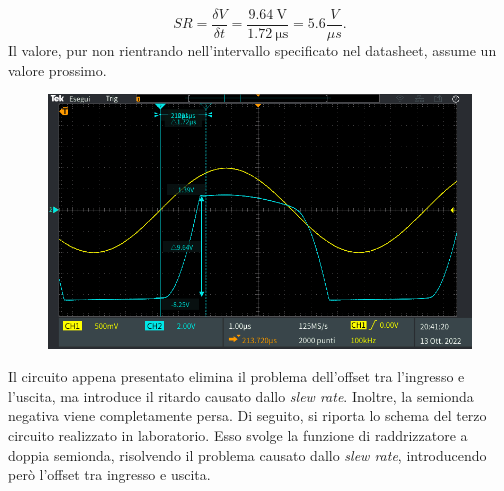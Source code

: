 \begin{equation}
	SR=\frac{\delta V}{\delta t}=\frac{\SI{9.64}{\volt}}{\SI{1.72}{\micro\second}}=5. 6\frac{V}{\mu s}.
\end{equation}
Il valore, pur non rientrando nell'intervallo specificato nel datasheet, assume un valore prossimo.
\begin{figure}[!ht]
	\centering
	\begin{minipage}{.45\textwidth}
		\includegraphics[width=\linewidth]{./ImageFiles/Laboratorio 2/TEK00040.PNG}
	\end{minipage}
	\label{fig:slewratevolt}
\end{figure}

Il circuito appena presentato elimina il problema dell'offset tra l'ingresso e l'uscita, ma introduce il ritardo causato dallo \textit{slew rate}. Inoltre, la semionda negativa viene completamente persa. Di seguito, si riporta lo schema del terzo circuito realizzato in laboratorio. Esso svolge la funzione di raddrizzatore a doppia semionda, risolvendo il problema causato dallo \textit{slew rate}, introducendo però l'offset tra ingresso e uscita.


